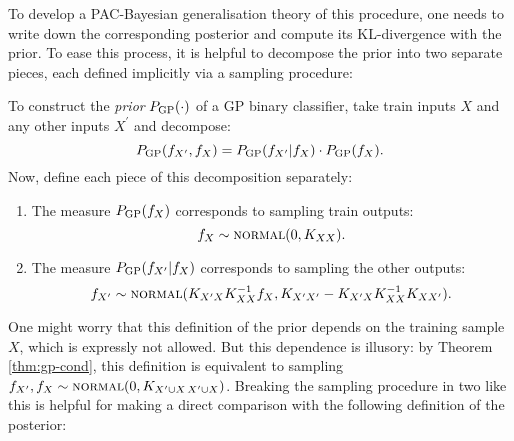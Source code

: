 \begin{refsection}
To develop a PAC-Bayesian generalisation theory of this procedure, one needs to write down the corresponding posterior and compute its KL-divergence with the prior. To ease this process, it is helpful to decompose the prior into two separate pieces, each defined implicitly via a sampling procedure:
\begin{definition}\label{def:gpc-prior} To construct the \textit{prior} $P_\mathrm{GP}(\cdot)$ of a GP binary classifier, take train inputs $X$ and any other inputs $X^\prime$ and decompose:
\begin{equation}
    P_\mathrm{GP}(f_{X^\prime}, f_X) = P_\mathrm{GP}(f_{X^\prime}|f_X) \cdot P_\mathrm{GP}(f_X).
\end{equation}
Now, define each piece of this decomposition separately:
\begin{enumerate}
    \item The measure $P_\mathrm{GP}(f_X)$ corresponds to sampling train outputs:
    \begin{equation}
        f_X \sim \textsc{normal}(0,K_{XX}).
    \end{equation}
    \item The measure $P_\mathrm{GP}(f_{X^\prime}|f_X)$ corresponds to sampling the other outputs:
    \begin{equation}
        f_{X^\prime} \sim \textsc{normal}(K_{X^\prime X}K_{XX}^{-1}f_X, K_{X^\prime X^\prime}-K_{X^\prime X}K_{XX}^{-1}K_{XX^\prime}).
    \end{equation}
\end{enumerate}
\end{definition}
One might worry that this definition of the prior depends on the training sample $X$, which is expressly not allowed. But this dependence is illusory: by Theorem \ref{thm:gp-cond}, this definition is equivalent to sampling  $f_{X^\prime}, f_X \sim \textsc{normal}(0,K_{X^\prime \cup X\,X^\prime\cup X})$. Breaking the sampling procedure in two like this is helpful for making a direct comparison with the following definition of the posterior:


\end{refsection}
